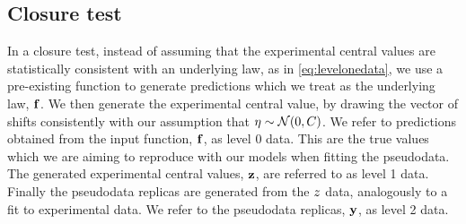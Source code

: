 \subsection{Closure test}

In a closure test, instead of assuming that the experimental central values are
statistically consistent with an underlying law, as in \eqref{eq:levelonedata},
we use a pre-existing function to generate predictions which we treat as the
underlying law, $\mathbf{f}$. We then generate the experimental
central value, by drawing the vector of shifts consistently with our assumption
that $\mathbf{\eta} \sim \mathcal{N}(0, C)$. We refer to predictions obtained
from the input function, $\mathbf{f}$, as level 0 data. This are the true values
which we are aiming to reproduce with our models when fitting the pseudodata.
The generated
experimental central values, $\mathbf{z}$, are referred to as level 1 data.
Finally the pseudodata replicas are generated from the $z$ data,
analogously to a fit to experimental data. We refer to the pseudodata replicas,
$\mathbf{y}$, as level 2 data.

